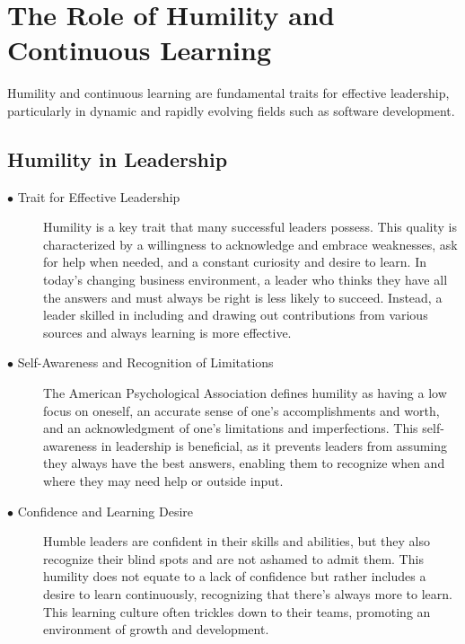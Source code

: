 \documentclass[runningheads]{llncs}
\begin{document}
\section{The Role of Humility and Continuous Learning}

Humility and continuous learning are fundamental traits for effective leadership, particularly in dynamic and rapidly evolving fields such as software development.

\subsection{Humility in Leadership}
\begin{description}

 \item [$\bullet$ Trait for Effective Leadership] Humility is a key trait that many successful leaders possess. This quality is characterized by a willingness to acknowledge and embrace weaknesses, ask for help when needed, and a constant curiosity and desire to learn. In today's changing business environment, a leader who thinks they have all the answers and must always be right is less likely to succeed. Instead, a leader skilled in including and drawing out contributions from various sources and always learning is more effective.\\

 \item [$\bullet$ Self-Awareness and Recognition of Limitations] The American Psychological Association defines humility as having a low focus on oneself, an accurate sense of one's accomplishments and worth, and an acknowledgment of one's limitations and imperfections. This self-awareness in leadership is beneficial, as it prevents leaders from assuming they always have the best answers, enabling them to recognize when and where they may need help or outside input.\\

 \item [$\bullet$ Confidence and Learning Desire] Humble leaders are confident in their skills and abilities, but they also recognize their blind spots and are not ashamed to admit them. This humility does not equate to a lack of confidence but rather includes a desire to learn continuously, recognizing that there's always more to learn. This learning culture often trickles down to their teams, promoting an environment of growth and development.\\
\end{description}
\end{document}
